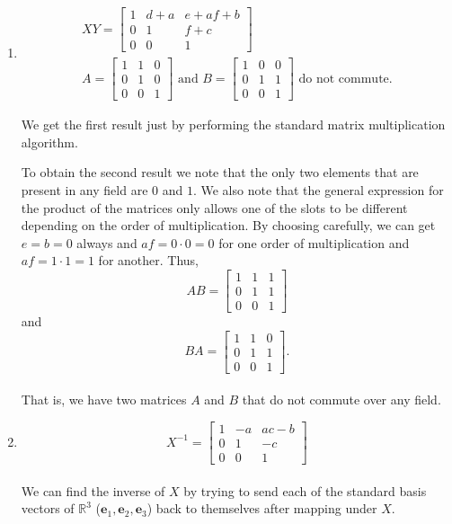 \documentclass[12 pt, letterpaper]{hmcpset}
\begin{document}
\begin{solution}
	\begin{enumerate}
		\item
			\[
				\boxed{
					\begin{gathered}
						XY = \begin{bmatrix}
							1 & d + a & e + af + b \\
							0 & 1 & f + c \\
							0 & 0 & 1
						\end{bmatrix} \\
						A = \begin{bmatrix}
							1 & 1 & 0 \\
							0 & 1 & 0 \\
							0 & 0 & 1
						\end{bmatrix} \text{ and }
						B = \begin{bmatrix}
							1 & 0 & 0 \\
							0 & 1 & 1 \\
							0 & 0 & 1
						\end{bmatrix} \text{ do not commute.}
					\end{gathered}
				}
			\] 

			We get the first result just by performing the standard matrix multiplication algorithm. 

			To obtain the second result we note that the only two elements that are present in any field are $0$ and $1$. We also note that the general expression for the product of the matrices only allows one of the slots to be different depending on the order of multiplication. By choosing carefully, we can get $e = b = 0$ always and $af = 0 \cdot 0 = 0$ for one order of multiplication and $af = 1 \cdot 1 = 1$ for another. Thus,
			\[
				AB = \begin{bmatrix}
					1 & 1 & 1 \\
					0 & 1 & 1 \\
					0 & 0 & 1
				\end{bmatrix}
			\]
			and
			\[
				BA = \begin{bmatrix}
					1 & 1 & 0 \\
					0 & 1 & 1 \\
					0 & 0 & 1
				\end{bmatrix}.
			\] \\
			That is, we have two matrices $A$ and $B$ that do not commute over any field.
		\item
			\[
				\boxed{
					X^{-1} = \begin{bmatrix}
						1 & - a & ac - b \\
						0 & 1 & - c \\
						0 & 0 & 1
					\end{bmatrix}
				}
			\] \\
			We can find the inverse of $X$ by trying to send each of the standard basis vectors of $\mathbb R^3$ ($\mathbf e_1, \mathbf e_2, \mathbf e_3$) back to themselves after mapping under $X$. 


\end{enumerate}
\end{solution}
\end{document}
